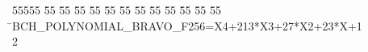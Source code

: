 %
%
\begin{tabbing}
55555 \= 55 \= 55 \= 55 \= 55 \= 55 \= 55 \= 55 \= 55 \= 55 \= 55 \= 55 \= 55 \= \>BCH\_POLYNOMIAL\_BRAVO\_F256=X4+213*X3+27*X2+23*X+1\\[0pt]
2\>\end{tabbing}
